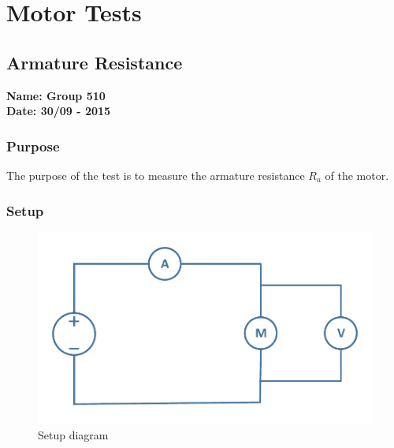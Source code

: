 \pagebreak
\section{Motor Tests}
\nopagebreak
\subsection{Armature Resistance} %
\textbf{Name: Group 510}\\
\textbf{Date: 30/09 - 2015}

\subsubsection{Purpose}
The purpose of the test is to measure the armature resistance $R_a$ of the motor.

\subsubsection{Setup}
\begin{figure}[H]
  \centering
	\includegraphics[scale=0.5]{figures/MotorTest1.pdf}
	\caption{Setup diagram}
\end{figure}


